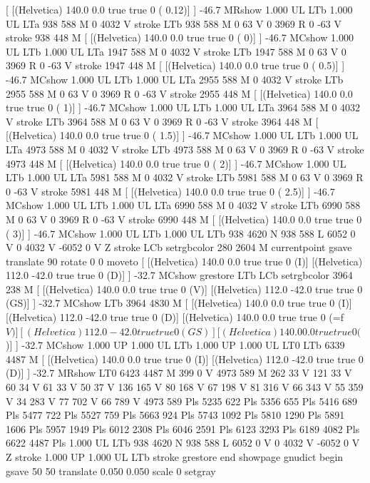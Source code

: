 [ [(Helvetica) 140.0 0.0 true true 0 ( 0.12)]
] -46.7 MRshow
1.000 UL
LTb
1.000 UL
LTa
938 588 M
0 4032 V
stroke
LTb
938 588 M
0 63 V
0 3969 R
0 -63 V
stroke
938 448 M
[ [(Helvetica) 140.0 0.0 true true 0 ( 0)]
] -46.7 MCshow
1.000 UL
LTb
1.000 UL
LTa
1947 588 M
0 4032 V
stroke
LTb
1947 588 M
0 63 V
0 3969 R
0 -63 V
stroke
1947 448 M
[ [(Helvetica) 140.0 0.0 true true 0 ( 0.5)]
] -46.7 MCshow
1.000 UL
LTb
1.000 UL
LTa
2955 588 M
0 4032 V
stroke
LTb
2955 588 M
0 63 V
0 3969 R
0 -63 V
stroke
2955 448 M
[ [(Helvetica) 140.0 0.0 true true 0 ( 1)]
] -46.7 MCshow
1.000 UL
LTb
1.000 UL
LTa
3964 588 M
0 4032 V
stroke
LTb
3964 588 M
0 63 V
0 3969 R
0 -63 V
stroke
3964 448 M
[ [(Helvetica) 140.0 0.0 true true 0 ( 1.5)]
] -46.7 MCshow
1.000 UL
LTb
1.000 UL
LTa
4973 588 M
0 4032 V
stroke
LTb
4973 588 M
0 63 V
0 3969 R
0 -63 V
stroke
4973 448 M
[ [(Helvetica) 140.0 0.0 true true 0 ( 2)]
] -46.7 MCshow
1.000 UL
LTb
1.000 UL
LTa
5981 588 M
0 4032 V
stroke
LTb
5981 588 M
0 63 V
0 3969 R
0 -63 V
stroke
5981 448 M
[ [(Helvetica) 140.0 0.0 true true 0 ( 2.5)]
] -46.7 MCshow
1.000 UL
LTb
1.000 UL
LTa
6990 588 M
0 4032 V
stroke
LTb
6990 588 M
0 63 V
0 3969 R
0 -63 V
stroke
6990 448 M
[ [(Helvetica) 140.0 0.0 true true 0 ( 3)]
] -46.7 MCshow
1.000 UL
LTb
1.000 UL
LTb
938 4620 N
938 588 L
6052 0 V
0 4032 V
-6052 0 V
Z stroke
LCb setrgbcolor
280 2604 M
currentpoint gsave translate 90 rotate 0 0 moveto
[ [(Helvetica) 140.0 0.0 true true 0 (I)]
[(Helvetica) 112.0 -42.0 true true 0 (D)]
] -32.7 MCshow
grestore
LTb
LCb setrgbcolor
3964 238 M
[ [(Helvetica) 140.0 0.0 true true 0 (V)]
[(Helvetica) 112.0 -42.0 true true 0 (GS)]
] -32.7 MCshow
LTb
3964 4830 M
[ [(Helvetica) 140.0 0.0 true true 0 (I)]
[(Helvetica) 112.0 -42.0 true true 0 (D)]
[(Helvetica) 140.0 0.0 true true 0 (=f\(V)]
[(Helvetica) 112.0 -42.0 true true 0 (GS)]
[(Helvetica) 140.0 0.0 true true 0 (\))]
] -32.7 MCshow
1.000 UP
1.000 UL
LTb
1.000 UP
1.000 UL
LT0
LTb
6339 4487 M
[ [(Helvetica) 140.0 0.0 true true 0 (I)]
[(Helvetica) 112.0 -42.0 true true 0 (D)]
] -32.7 MRshow
LT0
6423 4487 M
399 0 V
4973 589 M
262 33 V
121 33 V
60 34 V
61 33 V
50 37 V
136 165 V
80 168 V
67 198 V
81 316 V
66 343 V
55 359 V
34 283 V
77 702 V
66 789 V
4973 589 Pls
5235 622 Pls
5356 655 Pls
5416 689 Pls
5477 722 Pls
5527 759 Pls
5663 924 Pls
5743 1092 Pls
5810 1290 Pls
5891 1606 Pls
5957 1949 Pls
6012 2308 Pls
6046 2591 Pls
6123 3293 Pls
6189 4082 Pls
6622 4487 Pls
1.000 UL
LTb
938 4620 N
938 588 L
6052 0 V
0 4032 V
-6052 0 V
Z stroke
1.000 UP
1.000 UL
LTb
stroke
grestore
end
showpage
gnudict begin
gsave
50 50 translate
0.050 0.050 scale
0 setgray
